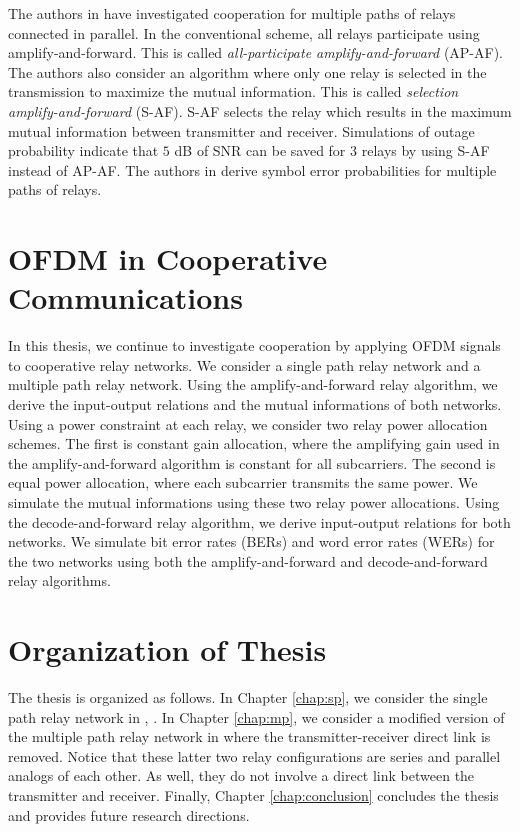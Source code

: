 The authors in \cite{article:Adve01} have investigated cooperation for multiple paths of relays connected in parallel.  In the conventional scheme, all relays participate using amplify-and-forward.  This is called \emph{all-participate amplify-and-forward} (AP-AF).  The authors also consider an algorithm where only one relay is selected in the transmission to maximize the mutual information.  This is called \emph{selection amplify-and-forward} (S-AF).  S-AF selects the relay which results in the maximum mutual information between transmitter and receiver.  Simulations of outage probability indicate that $5$ dB of SNR can be saved for 3 relays by using S-AF instead of AP-AF.  The authors in \cite{article:Ribeiro01} derive symbol error probabilities for multiple paths of relays.

\section{OFDM in Cooperative Communications}
In this thesis, we continue to investigate cooperation by applying OFDM signals to cooperative relay networks.  We consider a single path relay network and a multiple path relay network.  Using the amplify-and-forward relay algorithm, we derive the input-output relations and the mutual informations of both networks.  Using a power constraint at each relay, we consider two relay power allocation schemes.  The first is constant gain allocation, where the amplifying gain used in the amplify-and-forward algorithm is constant for all subcarriers.  The second is equal power allocation, where each subcarrier transmits the same power.  We simulate the mutual informations using these two relay power allocations.  Using the decode-and-forward relay algorithm, we derive input-output relations for both networks.  We simulate bit error rates (BERs) and word error rates (WERs) for the two networks using both the amplify-and-forward and decode-and-forward relay algorithms.

\section{Organization of Thesis}
The thesis is organized as follows.  In Chapter \ref{chap:sp}, we consider the single path relay network in \cite{article:Hasna02}, \cite{article:Hasna01}.  In Chapter \ref{chap:mp}, we consider a modified version of the multiple path relay network in \cite{article:Adve01} where the transmitter-receiver direct link is removed.  Notice that these latter two relay configurations are series and parallel analogs of each other.  As well, they do not involve a direct link between the transmitter and receiver.  Finally, Chapter \ref{chap:conclusion} concludes the thesis and provides future research directions.
